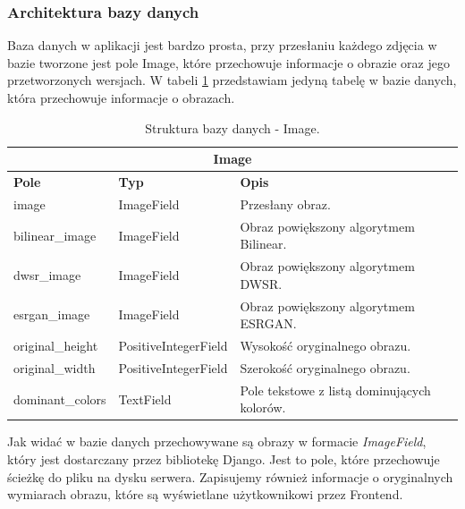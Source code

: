 \subsubsection*{Architektura bazy danych}

Baza danych w aplikacji jest bardzo prosta, przy przesłaniu każdego zdjęcia w bazie tworzone jest pole Image, które przechowuje informacje o obrazie oraz jego przetworzonych wersjach. W tabeli \ref{tab:image_model} przedstawiam jedyną tabelę w bazie danych, która przechowuje informacje o obrazach.

\begin{table}[ht]
    \centering
    \renewcommand{\arraystretch}{1.5} %
    \begin{tabular}{|l|l|p{8cm}|}
    \hline
    \multicolumn{3}{|c|}{\textbf{Image}}                                                        \\ \hline
    \textbf{Pole}       & \textbf{Typ}          & \textbf{Opis}                                 \\ \hline
    image               & ImageField            & Przesłany obraz.                              \\ \hline
    bilinear\_image     & ImageField            & Obraz powiększony algorytmem Bilinear.        \\ \hline
    dwsr\_image         & ImageField            & Obraz powiększony algorytmem DWSR.            \\ \hline
    esrgan\_image       & ImageField            & Obraz powiększony algorytmem ESRGAN.          \\ \hline
    original\_height    & PositiveIntegerField  & Wysokość oryginalnego obrazu.                 \\ \hline
    original\_width     & PositiveIntegerField  & Szerokość oryginalnego obrazu.                \\ \hline
    dominant\_colors    & TextField             & Pole tekstowe z listą dominujących kolorów.   \\ \hline
    \end{tabular}
    \caption{Struktura bazy danych - Image.}
    \label{tab:image_model}
\end{table}

Jak widać w bazie danych przechowywane są obrazy w formacie \textit{ImageField}, który jest dostarczany przez bibliotekę Django. Jest to pole, które przechowuje ścieżkę do pliku na dysku serwera. Zapisujemy również informacje o oryginalnych wymiarach obrazu, które są wyświetlane użytkownikowi przez Frontend. 

